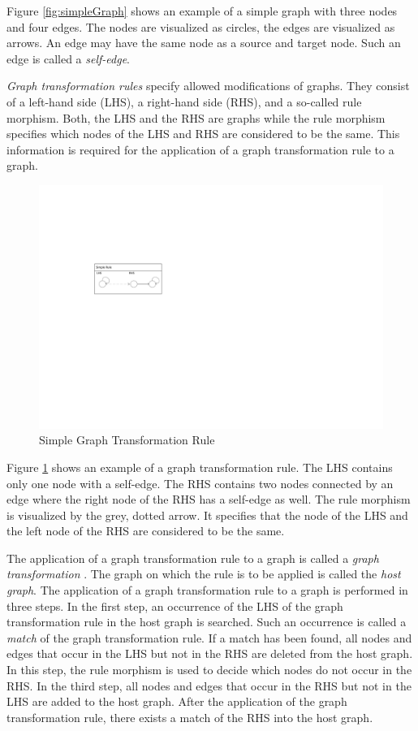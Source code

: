 Figure \ref{fig:simpleGraph} shows an example of a simple graph with three nodes and four edges. The nodes are visualized as circles, the edges are visualized as arrows. An edge may have the same node as a source and target node. Such an edge is called a \emph{self-edge}.

\emph{Graph transformation rules} specify allowed modifications of graphs. They consist of a left-hand side (LHS), a right-hand side (RHS), and a so-called rule morphism. Both, the LHS and the RHS are graphs while the rule morphism specifies which nodes of the LHS and RHS are considered to be the same. This information is required for the application of a graph transformation rule to a graph.

\begin{figure}[htbp]
  \centering
  \includegraphics[scale=1.5]{figures/SimpleGTRule}
  \caption{Simple Graph Transformation Rule}
  \label{fig:simpleGTRule}
\end{figure}

Figure \ref{fig:simpleGTRule} shows an example of a graph transformation rule. The LHS contains only one node with a self-edge. The RHS contains two nodes connected by an edge where the right node of the RHS has a self-edge as well. The rule morphism is visualized by the grey, dotted arrow. It specifies that the node of the LHS and the left node of the RHS are considered to be the same.

The application of a graph transformation rule to a graph is called a \emph{graph transformation} \cite{EEPT06}. The graph on which the rule is to be applied is called the \emph{host graph}.
The application of a graph transformation rule to a graph is performed in three steps. In the first step, an occurrence of the LHS of the graph transformation rule in the host graph is searched. Such an occurrence is called a \emph{match} of the graph transformation rule. If a match has been found, all nodes and edges that occur in the LHS but not in the RHS are deleted from the host graph. In this step, the rule morphism is used to decide which nodes do not occur in the RHS. In the third step, all nodes and edges that occur in the RHS but not in the LHS are added to the host graph. After the application of the graph transformation rule, there exists a match of the RHS into the host graph.

